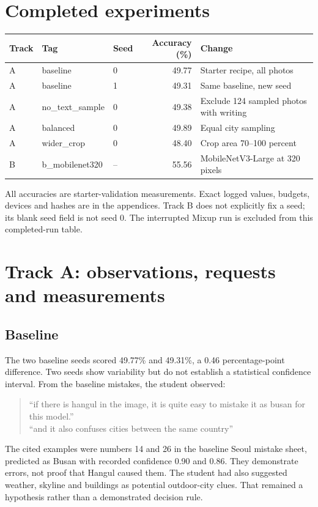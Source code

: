 \documentclass[11pt]{article}
\begin{document}
\section*{Completed experiments}
\begin{center}\scriptsize
\begin{tabular}{lllrl}
\toprule Track & Tag & Seed & Accuracy (\%) & Change \\ \midrule
A & baseline & 0 & 49.77 & Starter recipe, all photos \\
A & baseline & 1 & 49.31 & Same baseline, new seed \\
A & no\_text\_sample & 0 & 49.38 & Exclude 124 sampled photos with writing \\
A & balanced & 0 & 49.89 & Equal city sampling \\
A & wider\_crop & 0 & 48.40 & Crop area 70--100 percent \\
B & b\_mobilenet320 & -- & 55.56 & MobileNetV3-Large at 320 pixels \\
\bottomrule
\end{tabular}
\end{center}
All accuracies are starter-validation measurements. Exact logged values, budgets, devices and hashes are in the appendices. Track B does not explicitly fix a seed; its blank seed field is not seed 0. The interrupted Mixup run is excluded from this completed-run table.

\section*{Track A: observations, requests and measurements}
\subsection*{Baseline}
The two baseline seeds scored 49.77\% and 49.31\%, a 0.46 percentage-point difference. Two seeds show variability but do not establish a statistical confidence interval. From the baseline mistakes, the student observed:
\begin{quote}
``if there is hangul in the image, it is quite easy to mistake it as busan for this model.''\\
``and it also confuses cities between the same country''
\end{quote}
The cited examples were numbers 14 and 26 in the baseline Seoul mistake sheet, predicted as Busan with recorded confidence 0.90 and 0.86. They demonstrate errors, not proof that Hangul caused them. The student had also suggested weather, skyline and buildings as potential outdoor-city clues. That remained a hypothesis rather than a demonstrated decision rule.
\end{document}
